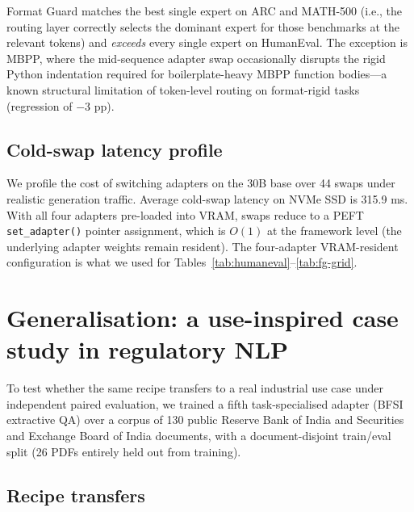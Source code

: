 \documentclass{article}
\begin{document}
Format Guard matches the best single expert on ARC and MATH-500 (i.e., the routing layer correctly selects the dominant expert for those benchmarks at the relevant tokens) and \emph{exceeds} every single expert on HumanEval. The exception is MBPP, where the mid-sequence adapter swap occasionally disrupts the rigid Python indentation required for boilerplate-heavy MBPP function bodies---a known structural limitation of token-level routing on format-rigid tasks (regression of $-3$ pp).

\subsection{Cold-swap latency profile}

We profile the cost of switching adapters on the 30B base over 44 swaps under realistic generation traffic. Average cold-swap latency on NVMe SSD is 315.9 ms. With all four adapters pre-loaded into VRAM, swaps reduce to a PEFT \texttt{set\_adapter()} pointer assignment, which is $O(1)$ at the framework level (the underlying adapter weights remain resident). The four-adapter VRAM-resident configuration is what we used for Tables~\ref{tab:humaneval}--\ref{tab:fg-grid}.


\section{Generalisation: a use-inspired case study in regulatory NLP}
\label{sec:bfsi}

To test whether the same recipe transfers to a real industrial use case under independent paired evaluation, we trained a fifth task-specialised adapter (BFSI extractive QA) over a corpus of 130 public Reserve Bank of India and Securities and Exchange Board of India documents, with a document-disjoint train/eval split (26 PDFs entirely held out from training).

\subsection{Recipe transfers}
\end{document}

